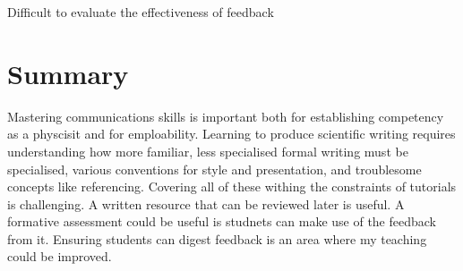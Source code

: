 Difficult to evaluate the effectiveness of feedback \citep{Price2010}

\section{Summary}

Mastering communications skills is important both for establishing competency as a physcisit and for emploability. Learning to produce scientific writing requires understanding how more familiar, less specialised formal writing must be specialised, various conventions for style and presentation, and troublesome concepts like referencing. Covering all of these withing the constraints of tutorials is challenging. A written resource that can be reviewed later is useful. A formative assessment could be useful is studnets can make use of the feedback from it. Ensuring students can digest feedback is an area where my teaching could be improved.
